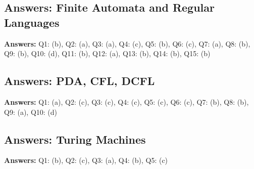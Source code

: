 \subsection*{Answers: Finite Automata and Regular Languages}
\noindent\textbf{Answers:} Q1: (b), Q2: (a), Q3: (a), Q4: (c), Q5: (b), Q6: (c), Q7: (a), Q8: (b), Q9: (b), Q10: (d), Q11: (b), Q12: (a), Q13: (b), Q14: (b), Q15: (b)

\subsection*{Answers: PDA, CFL, DCFL}
\noindent\textbf{Answers:} Q1: (a), Q2: (c), Q3: (c), Q4: (c), Q5: (c), Q6: (c), Q7: (b), Q8: (b), Q9: (a), Q10: (d)

\subsection*{Answers: Turing Machines}
\noindent\textbf{Answers:} Q1: (b), Q2: (c), Q3: (a), Q4: (b), Q5: (c)